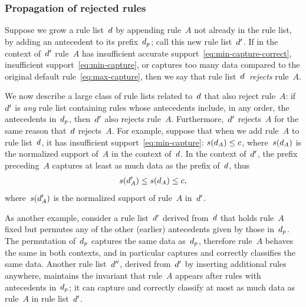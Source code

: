 \subsubsection{Propagation of rejected rules}

Suppose we grow a rule list~${d}$ by appending rule~$A$ not already in the rule list,
\ie by adding an antecedent to its prefix~$d_p$; call this new rule list~${d}'$.
%
If in the context of~${d}'$ rule~$A$ has insufficient accurate support~\eqref{eq:min-capture-correct},
insufficient support~\eqref{eq:min-capture},
or captures too many data compared to the original default rule~\eqref{eq:max-capture},
then we say that rule list~${d}$~\emph{rejects} rule~$A$.

We now describe a large class of rule lists related to~${d}$ that also reject rule~$A$:
if~${d}'$ is \emph{any} rule list containing rules whose antecedents include,
in any order, the antecedents in~$d_p$, then~${d}'$ also rejects rule~$A$.
%
Furthermore,~${d}'$ rejects~$A$ for the same reason that~${d}$ rejects~$A$.
%
For example, suppose that when we add rule~$A$ to rule list~${d}$,
it has insufficient support~\eqref{eq:min-capture}: ${s({d}_A) \le c}$,
where~$s({d}_A)$ is the normalized support of~$A$ in the context of~${d}$.
%
In the context of~${d}'$, the prefix preceding~$A$ captures at least
as much data as the prefix of~${d}$, thus
\begin{align}
s(\RL'_A) \le s(\RL_A) \le c,
\end{align}
where~$s({d}'_A)$ is the normalized support of rule~$A$ in~${d}'$.

As another example, consider a rule list~${d}'$ derived from~${d}$ that holds rule~$A$ fixed
but permutes any of the other (earlier) antecedents given by those in~$d_p$.
%
The permutation of~$d_p$ captures the same data as~$d_p$,
therefore rule~$A$ behaves the same in both contexts,
and in particular captures and correctly classifies the same data.
%
Another rule list~${d}''$, derived from~${d}'$ by inserting additional rules anywhere,
maintains the invariant that rule~$A$ appears after rules with antecedents in~$d_p$;
it can capture and correctly classify at most as much data as rule~$A$ in rule list~${d}'$.
%

